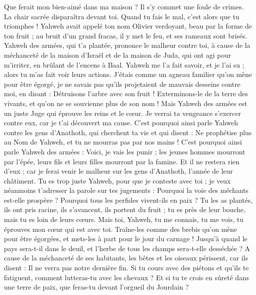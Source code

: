 \begin{multicols}{2}
Que ferait mon bien-aimé dans ma maison ? Il s’y commet une foule de crimes. La chair sacrée disparaîtra devant toi. Quand tu fais le mal, c’est alors que tu triomphes !
Yahweh avait appelé ton nom Olivier verdoyant, beau par la forme de ton fruit ; au bruit d'un grand fracas, il y met le feu, et ses rameaux sont brisés.
Yahweh des armées, qui t'a plantée, prononce le malheur contre toi, à cause de la méchanceté de la maison d'Israël et de la maison de Juda, qui ont agi pour m'irriter, en brûlant de l’encens à Baal.
Yahweh me l'a fait savoir, et je l'ai su ; alors tu m'as fait voir leurs actions.
J’étais comme un agneau familier qu’on mène pour être égorgé, je ne savais pas qu'ils projetaient de mauvais desseins contre moi, en disant : Détruisons l'arbre avec son fruit ! Exterminons-le de la terre des vivants, et qu'on ne se souvienne plus de son nom !
Mais Yahweh des armées est un juste Juge qui éprouve les reins et le cœur. Je verrai ta vengeance s’exercer contre eux, car je t’ai découvert ma cause.
C'est pourquoi ainsi parle Yahweh contre les gens d’Anathoth, qui cherchent ta vie et qui disent : Ne prophétise plus au Nom de Yahweh, et tu ne mourras pas par nos mains !
C'est pourquoi ainsi parle Yahweh des armées : Voici, je vais les punir ; les jeunes hommes mourront par l'épée, leurs fils et leurs filles mourront par la famine.
Et il ne restera rien d'eux ; car je ferai venir le malheur sur les gens d’Anathoth, l'année de leur châtiment.
\VerseOne{}Tu es trop juste Yahweh, pour que je conteste avec toi ; je veux néanmoins t’adresser la parole sur tes jugements : Pourquoi la voie des méchants est-elle prospère ? Pourquoi tous les perfides vivent-ils en paix ?
Tu les as plantés, ils ont pris racine, ils s'avancent, ils portent du fruit ; tu es près de leur bouche, mais tu es loin de leurs cœurs.
Mais toi, Yahweh, tu me connais, tu me vois, tu éprouves mon cœur qui est avec toi. Traîne-les comme des brebis qu'on mène pour être égorgées, et mets-les à part pour le jour du carnage !
Jusqu’à quand le pays sera-t-il dans le deuil, et l'herbe de tous les champs sera-t-elle desséchée ? A cause de la méchanceté de ses habitants, les bêtes et les oiseaux périssent, car ils disent : Il ne verra pas notre dernière fin.
Si tu cours avec des piétons et qu'ils te fatiguent, comment lutteras-tu avec les chevaux ? Et si tu te crois en sûreté dans une terre de paix, que feras-tu devant l’orgueil du Jourdain ?

\end{multicols}
